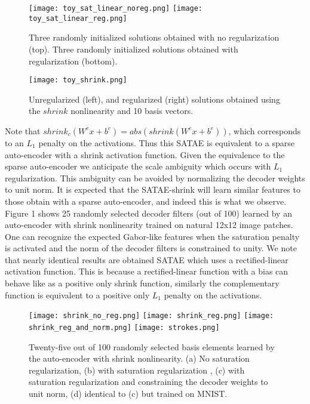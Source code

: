 \documentclass{article} %
\begin{document}
\begin{figure} \centering
\texttt{[image: toy\_sat\_linear\_noreg.png]}
\texttt{[image: toy\_sat\_linear\_reg.png]} \caption{Three randomly
initialized solutions obtained with no regularization (top). Three randomly
initialized solutions obtained with regularization (bottom).}  \end{figure} 

\begin{figure} \centering \texttt{[image: toy\_shrink.png]}
\caption{Unregularized (left), and regularized (right) solutions obtained using
the $shrink$ nonlinearity and 10 basis vectors.}  \end{figure} 

\noindent Note that $shrink_c(W^e x + b^e) =  abs(shrink(W^e x + b^e))$, which
corresponds to an $L_1$ penalty on the activations. Thus this SATAE is
equivalent to a sparse auto-encoder with a shrink activation function. Given
the equivalence to the sparse auto-encoder we anticipate the scale ambiguity
which occurs with $L_1$ regularization. This ambiguity can be avoided by
normalizing the decoder weights to unit norm. It is expected that the
SATAE-shrink will learn similar features to those obtain with a sparse
auto-encoder, and indeed this is what we observe. Figure 1 shows 25 randomly
selected decoder filters (out of 100) learned by an auto-encoder with shrink
nonlinearity trained on natural 12x12 image patches. One can recognize the
expected Gabor-like features when the saturation penalty is activated and the
norm of the decoder filters is constrained to unity. We note that nearly
identical results are obtained SATAE which uses a rectified-linear activation
function. This is because a rectified-linear function with a bias can behave
like as a positive only shrink function, similarly the complementary function
is equivalent to a positive only $L_1$ penalty on the activations.          

\begin{figure} \centering \texttt{[image: shrink\_no\_reg.png]}
\texttt{[image: shrink\_reg.png]}
\texttt{[image: shrink\_reg\_and\_norm.png]}
\texttt{[image: strokes.png]} \caption{Twenty-five out of 100
randomly selected basis elements learned by the auto-encoder with shrink
nonlinearity.  (a) No saturation regularization, (b) with saturation
regularization , (c) with saturation regularization and constraining the
decoder weights to unit norm, (d) identical to (c) but trained on MNIST.}
\end{figure} 
\end{document}
